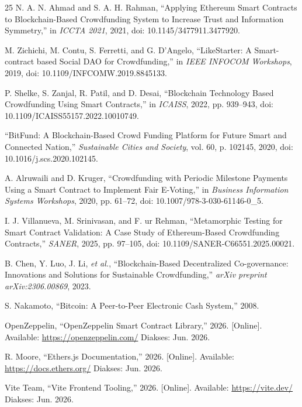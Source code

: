 \documentclass[conference]{IEEEtran}
\begin{document}
\begin{thebibliography}{25}
N. A. N. Ahmad and S. A. H. Rahman, ``Applying Ethereum Smart Contracts to Blockchain-Based Crowdfunding System to Increase Trust and Information Symmetry,'' in \textit{ICCTA 2021}, 2021, doi: 10.1145/3477911.3477920.

M. Zichichi, M. Contu, S. Ferretti, and G. D'Angelo, ``LikeStarter: A Smart-contract based Social DAO for Crowdfunding,'' in \textit{IEEE INFOCOM Workshops}, 2019, doi: 10.1109/INFCOMW.2019.8845133.

P. Shelke, S. Zanjal, R. Patil, and D. Desai, ``Blockchain Technology Based Crowdfunding Using Smart Contracts,'' in \textit{ICAISS}, 2022, pp. 939--943, doi: 10.1109/ICAISS55157.2022.10010749.

``BitFund: A Blockchain-Based Crowd Funding Platform for Future Smart and Connected Nation,'' \textit{Sustainable Cities and Society}, vol. 60, p. 102145, 2020, doi: 10.1016/j.scs.2020.102145.

A. Alruwaili and D. Kruger, ``Crowdfunding with Periodic Milestone Payments Using a Smart Contract to Implement Fair E-Voting,'' in \textit{Business Information Systems Workshops}, 2020, pp. 61--72, doi: 10.1007/978-3-030-61146-0\_5.

I. J. Villanueva, M. Srinivasan, and F. ur Rehman, ``Metamorphic Testing for Smart Contract Validation: A Case Study of Ethereum-Based Crowdfunding Contracts,'' \textit{SANER}, 2025, pp. 97--105, doi: 10.1109/SANER-C66551.2025.00021.

B. Chen, Y. Luo, J. Li, \textit{et al.}, ``Blockchain-Based Decentralized Co-governance: Innovations and Solutions for Sustainable Crowdfunding,'' \textit{arXiv preprint arXiv:2306.00869}, 2023.

S. Nakamoto, ``Bitcoin: A Peer-to-Peer Electronic Cash System,'' 2008.

OpenZeppelin, ``OpenZeppelin Smart Contract Library,'' 2026. [Online]. Available: \url{https://openzeppelin.com/} Diakses: Jun. 2026.

R. Moore, ``Ethers.js Documentation,'' 2026. [Online]. Available: \url{https://docs.ethers.org/} Diakses: Jun. 2026.

Vite Team, ``Vite Frontend Tooling,'' 2026. [Online]. Available: \url{https://vite.dev/} Diakses: Jun. 2026.


\end{thebibliography}
\end{document}
